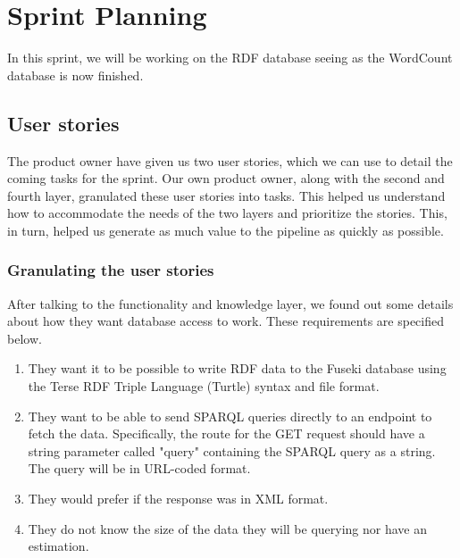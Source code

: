 \section{Sprint Planning}\label{section:sprintPlanningSprint5}
In this sprint, we will be working on the RDF database seeing as the WordCount database is now finished.

\subsection*{User stories}\label{sec:userstories5}
The \knox{} product owner have given us two user stories, which we can use to detail the coming tasks for the sprint.
Our own product owner, along with the second and fourth layer, granulated these user stories into tasks.
This helped us understand how to accommodate the needs of the two layers and prioritize the stories.
This, in turn, helped us generate as much value to the pipeline as quickly as possible\cite{UserStories}.


\subsubsection*{Granulating the user stories}
After talking to the functionality and knowledge layer, we found out some details about how they want database access to work. These requirements are specified below.



\begin{enumerate}
    \item They want it to be possible to write RDF data to the Fuseki database using the Terse RDF Triple Language (Turtle) syntax and file format\cite{TurtleFormat}.
    \item They want to be able to send SPARQL queries directly to an endpoint to fetch the data. Specifically, the route for the GET request should have a string parameter called "query" containing the SPARQL query as a string. The query will be in URL-coded format.
    \item They would prefer if the response was in XML format.
    \item They do not know the size of the data they will be querying nor have an estimation.
\end{enumerate}

